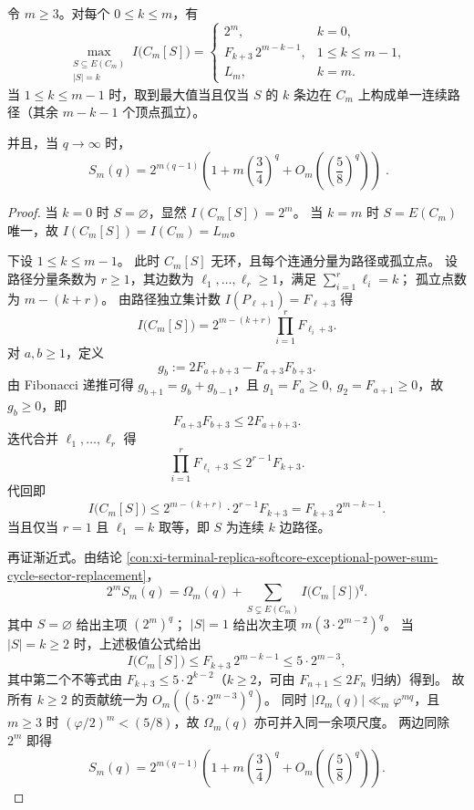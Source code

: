 \begin{conclusion}[定边数约束下循环子图独立集极值与例外幂和主导渐近]\label{con:xi-terminal-replica-softcore-exceptional-moments-exponential-hierarchy}
令 \(m\ge3\)。对每个 \(0\le k\le m\)，有
\[
\boxed{\;
\max_{\substack{S\subseteq E(C_m)\\ |S|=k}} I\!\bigl(C_m[S]\bigr)=
\begin{cases}
2^m, & k=0,\\[3pt]
F_{k+3}\,2^{m-k-1}, & 1\le k\le m-1,\\[3pt]
L_m, & k=m.
\end{cases}
\;}
\]
当 \(1\le k\le m-1\) 时，取到最大值当且仅当 \(S\) 的 \(k\) 条边在 \(C_m\) 上构成单一连续路径（其余 \(m-k-1\) 个顶点孤立）。

并且，当 \(q\to\infty\) 时，
\[
\boxed{\;
S_m(q)=2^{m(q-1)}\left(1+m\left(\frac34\right)^q+O_m\!\left(\left(\frac58\right)^q\right)\right)\; } .
\]
\end{conclusion}
\begin{proof}
当 \(k=0\) 时 \(S=\varnothing\)，显然 \(I(C_m[S])=2^m\)。
当 \(k=m\) 时 \(S=E(C_m)\) 唯一，故 \(I(C_m[S])=I(C_m)=L_m\)。

下设 \(1\le k\le m-1\)。
此时 \(C_m[S]\) 无环，且每个连通分量为路径或孤立点。
设路径分量条数为 \(r\ge1\)，其边数为 \(\ell_1,\dots,\ell_r\ge1\)，满足
\(
\sum_{i=1}^{r}\ell_i=k
\)；
孤立点数为 \(m-(k+r)\)。
由路径独立集计数 \(I(P_{\ell+1})=F_{\ell+3}\) 得
\[
I\!\bigl(C_m[S]\bigr)=2^{m-(k+r)}\prod_{i=1}^{r}F_{\ell_i+3}.
\]
对 \(a,b\ge1\)，定义
\[
g_b:=2F_{a+b+3}-F_{a+3}F_{b+3}.
\]
由 Fibonacci 递推可得 \(g_{b+1}=g_b+g_{b-1}\)，且
\(
g_1=F_a\ge0,\ g_2=F_{a+1}\ge0
\)，故 \(g_b\ge0\)，即
\[
F_{a+3}F_{b+3}\le 2F_{a+b+3}.
\]
迭代合并 \(\ell_1,\dots,\ell_r\) 得
\[
\prod_{i=1}^{r}F_{\ell_i+3}\le 2^{r-1}F_{k+3}.
\]
代回即
\[
I\!\bigl(C_m[S]\bigr)\le 2^{m-(k+r)}\cdot 2^{r-1}F_{k+3}
=F_{k+3}\,2^{m-k-1}.
\]
当且仅当 \(r=1\) 且 \(\ell_1=k\) 取等，即 \(S\) 为连续 \(k\) 边路径。

再证渐近式。由结论
\ref{con:xi-terminal-replica-softcore-exceptional-power-sum-cycle-sector-replacement}，
\[
2^mS_m(q)=\Omega_m(q)+\sum_{S\subsetneq E(C_m)}I\!\bigl(C_m[S]\bigr)^q.
\]
其中 \(S=\varnothing\) 给出主项 \((2^m)^q\)；
\(|S|=1\) 给出次主项 \(m(3\cdot 2^{m-2})^q\)。
当 \(|S|=k\ge2\) 时，上述极值公式给出
\[
I\!\bigl(C_m[S]\bigr)\le F_{k+3}\,2^{m-k-1}\le 5\cdot 2^{m-3},
\]
其中第二个不等式由 \(F_{k+3}\le 5\cdot 2^{k-2}\)（\(k\ge2\)，可由 \(F_{n+1}\le2F_n\) 归纳）得到。
故所有 \(k\ge2\) 的贡献统一为 \(O_m((5\cdot 2^{m-3})^q)\)。
同时 \(|\Omega_m(q)|\ll_m \varphi^{mq}\)，且 \(m\ge3\) 时
\(
(\varphi/2)^m<(5/8)
\)，故 \(\Omega_m(q)\) 亦可并入同一余项尺度。
两边同除 \(2^m\) 即得
\[
S_m(q)=2^{m(q-1)}\left(1+m\left(\frac34\right)^q+O_m\!\left(\left(\frac58\right)^q\right)\right).
\]
\end{proof}

